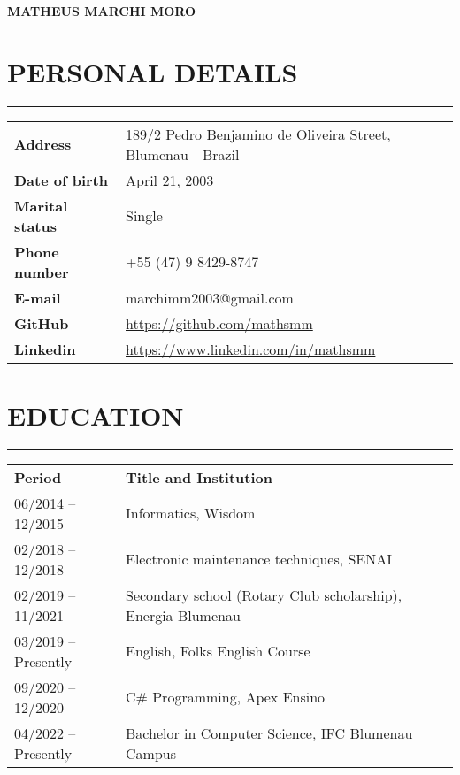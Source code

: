 \documentclass[11pt]{article}
\begin{document}
\begin{flushleft}
    \Huge \textbf{MATHEUS MARCHI MORO}
\end{flushleft}

\bigskip

\section*{PERSONAL DETAILS}
\hrule
\begin{flushleft}
\begin{tabular}{p{0.25\linewidth}p{0.8\linewidth}}
    \vspace{0.1em}\textbf{Address} & \vspace{0.1em}189/2 Pedro Benjamino de Oliveira Street, Blumenau - Brazil \\
    \textbf{Date of birth} & April 21, 2003 \\
    \textbf{Marital status} & Single \\
    \textbf{Phone number} & +55 (47) 9 8429-8747 \\
    \textbf{E-mail} & marchimm2003@gmail.com \\
    \textbf{GitHub} & \url{https://github.com/mathsmm} \\
    \textbf{Linkedin} & \url{https://www.linkedin.com/in/mathsmm}
\end{tabular}
\end{flushleft}

\vspace{1.0em}\section*{EDUCATION}
\hrule
\begin{flushleft}
\begin{tabular}{p{0.25\linewidth}p{0.8\linewidth}}
    \vspace{0.1em}\textbf{Period} & \vspace{0.1em}\textbf{Title and Institution} \\
    06/2014 -- 12/2015 & Informatics, Wisdom \\
    02/2018 -- 12/2018 & Electronic maintenance techniques, SENAI \\
    02/2019 -- 11/2021 & Secondary school (Rotary Club scholarship), Energia Blumenau \\
    03/2019 -- Presently & English, Folks English Course \\
    09/2020 -- 12/2020 & C\# Programming, Apex Ensino \\
    04/2022 -- Presently & Bachelor in Computer Science, IFC Blumenau Campus \\
\end{tabular}
\end{flushleft}
\end{document}
